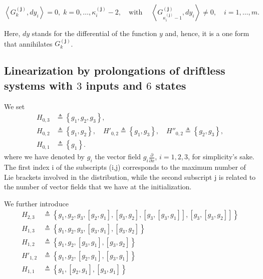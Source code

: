 \documentclass[10pt]{article}
\newcommand{\3}{\mathbf{3}}
\newcommand{\2}{\mathbf{2}}
\newcommand{\1}{\mathbf{1}}
\newcommand{\0}{\mathbf{0}}
\newcommand{\bj}{\mathbf{j}}
\begin{document}
\begin{equation}\label{PDEsj:eq}
\left< G_{k}^{(\bj)},  dy_{i} \right>= 0, \; k= 0,\ldots, \kappa_{i}^{(\bj)}-2, \quad \mathrm{with~}
\quad \left< G_{\kappa_{i}^{(\bj)}-1}^{(\bj)},  dy_{i} \right>\neq 0, \quad i=1, \ldots,m.
\end{equation}

Here, $dy$ stands for the differential of the function $y$ and, hence, it is a one form that annihilates $G_{k}^{(\bj)}$.

\subsection{Linearization by prolongations of driftless systems with $3$ inputs and $6$ states}
\label{6states}



We set
\begin{equation}\label{H0:eq}
\begin{aligned}
H_{0,3}&\triangleq \left\{g_{1}, g_{2}, g_{3}\right\},\\
H_{0,2}&\triangleq \left\{g_{1}, g_{2}\right\}, \quad H'_{0,2} \triangleq  \left\{g_{1}, g_{3}\right\}, \quad H''_{0,2}\triangleq  \left\{g_{2}, g_{3}\right\},\\
H_{0,1}&\triangleq \left\{g_{1}\right\}.
\end{aligned}
\end{equation}
where we have denoted by $g_{i}$ the vector field $g_{i}\frac{\partial}{\partial x}$, $i=1,2,3$, for simplicity's sake. The first index i of the subscripts (i,j) corresponds to the maximum number of Lie brackets involved in the distribution, while the second subscript j is related to the number of vector fields that we have at the initialization.

We further introduce
\begin{equation}\label{H2:eq}
\begin{aligned}
H_{2,3} &\triangleq \left\{g_{1}, g_{2}, g_{3}, [g_{2},g_{1}], [g_{3},g_{2}], [g_{3},[g_{3},g_{1}]], [g_{3},[g_{3},g_{2}]] \right\}\\
H_{1,3} &\triangleq \left\{g_{1}, g_{2}, g_{3}, [g_{3},g_{1}], [g_{3},g_{2}]\right\}\\
H_{1,2} &\triangleq \left\{g_{1}, g_{2}, [g_{3},g_{1}], [g_{3},g_{2}]\right\}\\
H'_{1,2} &\triangleq \left\{g_{1}, g_{2}, [g_{2},g_{1}], [g_{3},g_{1}]\right\}\\
H_{1,1} &\triangleq \left\{ g_{1}, [g_{2},g_{1}], [g_{3},g_{1}]\right\}
\end{aligned}
\end{equation}
\end{document}
